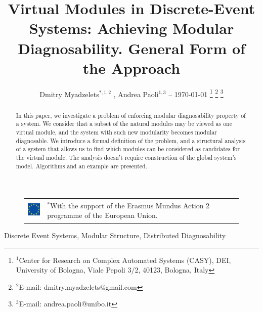 \documentclass[a4paper, 10pt, conference]{ieeeconf}
\begin{document}
\title{Virtual Modules in Discrete-Event Systems: 
Achieving Modular Diagnosability. General Form of the Approach}
\author{
	Dmitry Myadzelets$^{*,1,2}$
	, Andrea Paoli$^{1,3}$
	-- \today
	\thanks{$^{1}$Center for Research on Complex Automated Systems (CASY), DEI,
	University of Bologna, Viale Pepoli 3/2, 40123, Bologna, Italy}
		\thanks{$^{2}$E-mail: {dmitry.myadzelets@gmail.com}}
		\thanks{$^{3}$E-mail: {andrea.paoli@unibo.it}}
}
\maketitle

\begin{figure}[!b]
\begin{tabular}{l p{60mm}}
 	\includegraphics[height=10mm]{EU_flag.eps}
 	& \vspace{-10mm} \footnotesize
 	$^{*}$With the support of the Erasmus Mundus Action 2 programme of the
 	European Union.
\end{tabular}
\end{figure}

\begin{abstract} In this paper, we investigate a problem of enforcing modular
diagnosability property of a system. We consider that a subset of the natural
modules may be viewed as one virtual module, and the system with such new
modularity becomes modular diagnosable. We introduce a formal definition of the
problem, and a structural analysis of a system that allows us to find which
modules can be considered as candidates for the virtual module. The analysis
doesn't require construction of the global system's model. Algorithms and an
example are presented.
\end{abstract}

\begin{keywords}
Discrete Event Systems, Modular Structure, Distributed Diagnosability
\end{keywords}

\newtheorem{theorem}{Theorem}
\newtheorem{definition}{Definition}
\newtheorem{lemma}{Lemma}
\newtheorem{assumption}{Assumption}
\newtheorem{corollary}{Corollary}
\newtheorem{example}{Example}
\end{document}
